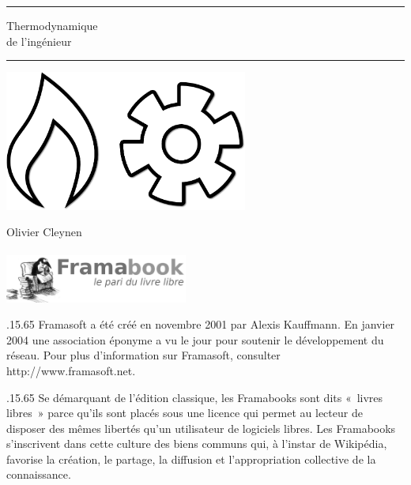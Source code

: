 \begin{titlepage}
\vspace*{4cm}
\begin{center}
	\vspace{1em}\par \rule{15cm}{.1pt}
	{\HUGE Thermodynamique\\ de l’ingénieur}
	\vspace{1em}\par \rule{15cm}{.1pt}

	\vspace{4cm}
	\includegraphics[width=8cm]{images/thermodynamics.png}
	\vspace{2cm}

	{\LARGE Olivier Cleynen\\
	\ccLogo\ \ccAttribution\ \ccShareAlike}\\
	\includegraphics[width=60mm]{images/Logo_framabook_grand.png}
\end{center}

\clearpage

\vspace*{5cm}
{ .15\hsize.65\hsize
	Framasoft a été créé en novembre 2001 par Alexis Kauffmann. En janvier 2004 une association éponyme a vu le jour pour soutenir le développement du réseau. Pour plus d’information sur Framasoft, consulter http://www.framasoft.net.

}

{ .15\hsize.65\hsize
	Se démarquant de l’édition classique, les Framabooks sont dits «~livres libres~» parce qu’ils sont placés sous une licence qui permet au lecteur de disposer des mêmes libertés qu’un utilisateur de logiciels libres. Les Framabooks s’inscrivent dans cette culture des biens communs qui, à l’instar de Wikipédia, favorise la création, le partage, la diffusion et l’appropriation collective de la connaissance.

}
\end{titlepage}

